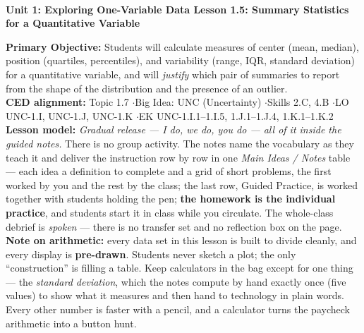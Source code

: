 \documentclass[10pt]{article}
\newcommand{\UnitNumberName}{Unit 1: Exploring One-Variable Data \quad}
\newcommand{\LessonNumberName}{Lesson 1.5: Summary Statistics for a Quantitative Variable}
\begin{document}
\begin{center}
    {\Large\bfseries \CourseName \\
    {\small\bfseries \UnitNumberName \LessonNumberName}}
\end{center}

\begin{tcolorbox}[colback=sky, colframe=navy, boxrule=0.9pt, arc=2mm,
    left=2mm, right=2mm, top=1.5mm, bottom=1.5mm]
    \textbf{Primary Objective:} Students will calculate measures of center (mean, median),
    position (quartiles, percentiles), and variability (range, IQR, standard deviation) for a
    quantitative variable, and will \emph{justify} which pair of summaries to report from the
    shape of the distribution and the presence of an outlier.
    \\[2pt]
    \textbf{CED alignment:} Topic 1.7 \quad$\cdot$\quad Big Idea: UNC (Uncertainty)
    \quad$\cdot$\quad Skills 2.C, 4.B \quad$\cdot$\quad LO UNC-1.I, UNC-1.J, UNC-1.K
    \quad$\cdot$\quad EK UNC-1.I.1--1.I.5, 1.J.1--1.J.4, 1.K.1--1.K.2
    \\[2pt]
    \textbf{Lesson model:} \emph{Gradual release --- I do, we do, you do --- all of it inside
    the guided notes.} There is no group activity. The notes name the vocabulary as they teach
    it and deliver the instruction row by row in one \emph{Main Ideas / Notes} table --- each
    idea a definition to complete and a grid of short problems, the first worked by you and the
    rest by the class; the last row, Guided Practice, is worked together with students holding
    the pen; \textbf{the homework is the individual practice}, and students
    start it in class while you circulate. The whole-class debrief is \emph{spoken} ---
    there is no transfer set and no reflection box on the page.
    \\[2pt]
    \textbf{Note on arithmetic:} every data set in this lesson is built to divide cleanly, and
    every display is \textbf{pre-drawn}. Students never sketch a plot; the only ``construction''
    is filling a table. Keep calculators in the bag except for one thing --- the
    \emph{standard deviation}, which the notes compute by hand exactly once (five values) to
    show what it measures and then hand to technology in plain words. Every other number is
    faster with a pencil, and a calculator turns the paycheck arithmetic into a button hunt.
\end{tcolorbox}
\end{document}
